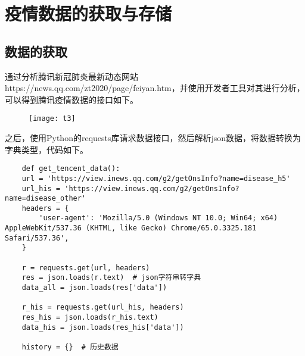 \chapter{疫情数据的获取与存储}
\section{数据的获取}

通过分析腾讯新冠肺炎最新动态网站https://news.qq.com/zt2020/page/feiyan.htm，并使用开发者工具对其进行分析，可以得到腾讯疫情数据的接口如下。

\begin{figure}[H]
    \centering
    \texttt{[image: t3]}
    \label{fig:t3}
\end{figure}

之后，使用Python的requests库请求数据接口，然后解析json数据，将数据转换为字典类型，代码如下。

\begin{lstlisting}
    def get_tencent_data():
    url = 'https://view.inews.qq.com/g2/getOnsInfo?name=disease_h5'
    url_his = 'https://view.inews.qq.com/g2/getOnsInfo?name=disease_other'
    headers = {
        'user-agent': 'Mozilla/5.0 (Windows NT 10.0; Win64; x64) AppleWebKit/537.36 (KHTML, like Gecko) Chrome/65.0.3325.181 Safari/537.36',
    }

    r = requests.get(url, headers)
    res = json.loads(r.text)  # json字符串转字典
    data_all = json.loads(res['data'])

    r_his = requests.get(url_his, headers)
    res_his = json.loads(r_his.text)
    data_his = json.loads(res_his['data'])

    history = {}  # 历史数据
\end{lstlisting}

